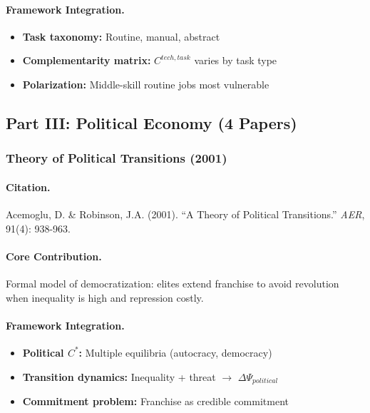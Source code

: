 \paragraph{Framework Integration.}
\begin{itemize}
  \item \textbf{Task taxonomy:} Routine, manual, abstract
  \item \textbf{Complementarity matrix:} $C^{tech,task}$ varies by task type
  \item \textbf{Polarization:} Middle-skill routine jobs most vulnerable
\end{itemize}

\subsection{Part III: Political Economy (4 Papers)}

\subsubsection{Theory of Political Transitions (2001)}

\paragraph{Citation.}
Acemoglu, D. \& Robinson, J.A. (2001).
``A Theory of Political Transitions.'' \emph{AER}, 91(4): 938-963.

\paragraph{Core Contribution.}
Formal model of democratization: elites extend franchise to avoid
revolution when inequality is high and repression costly.

\paragraph{Framework Integration.}
\begin{itemize}
  \item \textbf{Political $C^*$:} Multiple equilibria (autocracy, democracy)
  \item \textbf{Transition dynamics:} Inequality + threat $\to$ $\Delta\Psi_{political}$
  \item \textbf{Commitment problem:} Franchise as credible commitment
\end{itemize}

